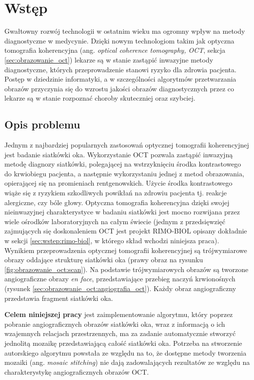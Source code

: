 %
\chapter{Wstęp}
\label{sec:wstep}

Gwałtowny rozwój technologii w ostatnim wieku ma ogromny wpływ na metody diagnostyczne w medycynie. Dzięki nowym technologiom takim jak optyczna tomografia koherencyjna (ang. \textit{optical coherence tomography, OCT}, sekcja \ref{sec:obrazowanie_oct}) lekarze są w stanie zastąpić inwazyjne metody diagnostyczne, których przeprowadzenie stanowi ryzyko dla zdrowia pacjenta. Postęp w dziedzinie informatyki, a w szczególności algorytmów przetwarzania obrazów przyczynia się do wzrostu jakości obrazów diagnostycznych przez co lekarze są w stanie rozpoznać choroby skuteczniej oraz szybciej.

\section{Opis problemu}
\label{sec:wstep:opis_problemu}

Jednym z najbardziej popularnych zastosowań optycznej tomografii koherencyjnej jest badanie siatkówki oka. Wykorzystanie OCT pozwala zastąpić inwazyjną metodę diagnozy siatkówki, polegającej na wstrzyknięciu środka kontrastowego do krwiobiegu pacjenta, a następnie wykorzystaniu jednej z metod obrazowania, opierającej się na promieniach rentgenowskich. Użycie środka kontrastowego wiąże się z ryzykiem szkodliwych powikłań na zdrowiu pacjenta tj. reakcje alergiczne, czy bóle głowy. Optyczna tomografia koherencyjna dzięki swojej nieinwazyjnej charakterystyce w badaniu siatkówki jest mocno rozwijana przez wiele ośrodków laboratoryjnych na całym świecie (jednym z przedsięwzięć zajmujących się doskonaleniem OCT jest projekt RIMO-BIOL opisany dokładnie w sekcji \ref{sec:wstep:rimo-biol}, w którego skład wchodzi niniejsza praca). Wynikiem przeprowadzenia optycznej tomografii koherencyjnej są trójwymiarowe obrazy oddające strukturę siatkówki oka (prawy obraz na rysunku \ref{fig:obrazowanie_oct:scan}). Na podstawie trójwymiarowych obrazów są tworzone angiograficzne obrazy \textit{en face}, przedstawiające przebieg naczyń krwionośnych (rysunek \ref{sec:obrazowanie_oct:angiografia_oct}). Każdy obraz angiograficzny przedstawia fragment siatkówki oka.

\textbf{Celem niniejszej pracy} jest zaimplementowanie algorytmu, który poprzez pobranie angiograficznych obrazów siatkówki oka, wraz z informacją o ich wzajemnych relacjach przestrzennych, ma za zadanie automatycznie stworzyć jednolitą mozaikę przedstawiającą całość siatkówki oka. Potrzeba na stworzenie autorskiego algorytmu powstała ze względu na to, że dostępne metody tworzenia mozaiki (ang. \textit{mosaic stitching}) nie dają zadowalających rezultatów ze względu na charakterystykę angiograficznych obrazów OCT.


